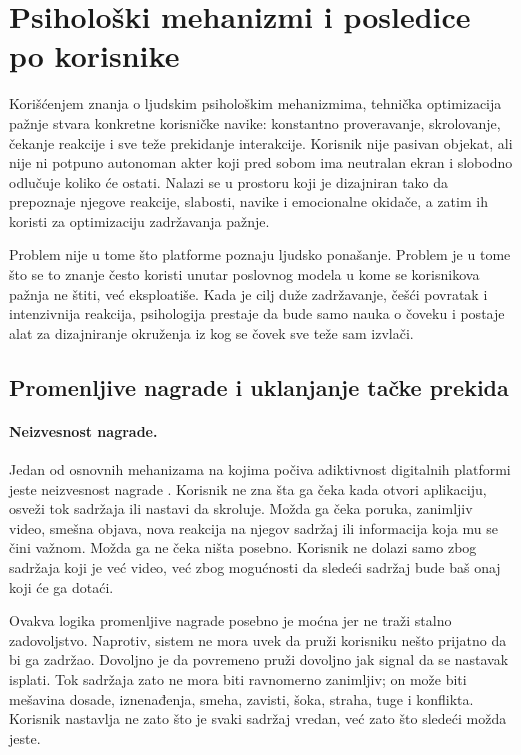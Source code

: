 \section{Psihološki mehanizmi i posledice po korisnike}

Korišćenjem znanja o ljudskim psihološkim mehanizmima, tehnička optimizacija pažnje stvara konkretne korisničke navike: konstantno proveravanje, skrolovanje, čekanje reakcije i sve teže prekidanje interakcije. Korisnik nije pasivan objekat, ali nije ni potpuno autonoman akter koji pred sobom ima neutralan ekran i slobodno odlučuje koliko će ostati. Nalazi se u prostoru koji je dizajniran tako da prepoznaje njegove reakcije, slabosti, navike i emocionalne okidače, a zatim ih koristi za optimizaciju zadržavanja pažnje.

Problem nije u tome što platforme poznaju ljudsko ponašanje. Problem je u tome što se to znanje često koristi unutar poslovnog modela u kome se korisnikova pažnja ne štiti, već eksploatiše. Kada je cilj duže zadržavanje, češći povratak i intenzivnija reakcija, psihologija prestaje da bude samo nauka o čoveku i postaje alat za dizajniranje okruženja iz kog se čovek sve teže sam izvlači.

\subsection{Promenljive nagrade i uklanjanje tačke prekida}

\paragraph{Neizvesnost nagrade.}
Jedan od osnovnih mehanizama na kojima počiva adiktivnost digitalnih platformi jeste neizvesnost nagrade \cite{montag2019addictive}. Korisnik ne zna šta ga čeka kada otvori aplikaciju, osveži tok sadržaja ili nastavi da skroluje. Možda ga čeka poruka, zanimljiv video, smešna objava, nova reakcija na njegov sadržaj ili informacija koja mu se čini važnom. Možda ga ne čeka ništa posebno. Korisnik ne dolazi samo zbog sadržaja koji je već video, već zbog mogućnosti da sledeći sadržaj bude baš onaj koji će ga dotaći.

Ovakva logika promenljive nagrade posebno je moćna jer ne traži stalno zadovoljstvo. Naprotiv, sistem ne mora uvek da pruži korisniku nešto prijatno da bi ga zadržao. Dovoljno je da povremeno pruži dovoljno jak signal da se nastavak isplati. Tok sadržaja zato ne mora biti ravnomerno zanimljiv; on može biti mešavina dosade, iznenađenja, smeha, zavisti, šoka, straha, tuge i konflikta. Korisnik nastavlja ne zato što je svaki sadržaj vredan, već zato što sledeći možda jeste.

